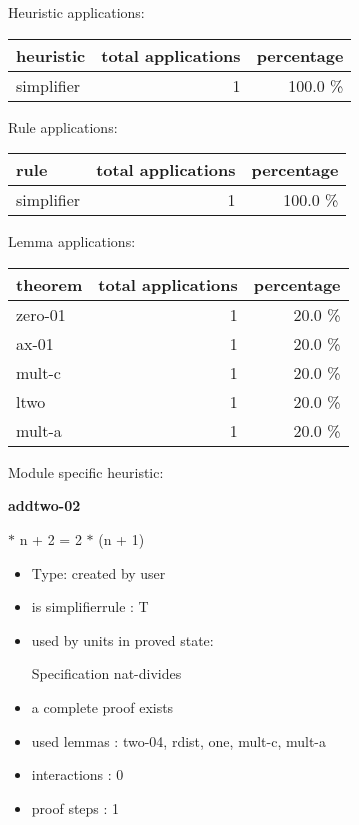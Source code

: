 \documentclass[a4paper]{article}
\begin{document}
\medskip


Heuristic applications:

\begin{supertabular}{l|r|r}
heuristic	& total applications & percentage \\ \hline
simplifier & 1 & 100.0 \% \\

\end{supertabular}

Rule applications:

\begin{supertabular}{l|r|r}
rule	        & total applications & percentage \\ \hline
simplifier & 1 & 100.0 \% \\

\end{supertabular}

Lemma applications:

\begin{supertabular}{l|r|r}
theorem	        & total applications & percentage \\ \hline
zero-01 & 1 & 20.0 \% \\
ax-01 & 1 & 20.0 \% \\
mult-c & 1 & 20.0 \% \\
ltwo & 1 & 20.0 \% \\
mult-a & 1 & 20.0 \% \\

\end{supertabular}

Module specific heuristic:

\pagebreak

{\LARGE\bf addtwo-02}\label{lemma-addtwo-02}

\medskip

  $*$ n + 2 = 2 $*$ (n + 1)

\begin{itemize}

\item Type: created by user

\item is simplifierrule : T
\item used by units in proved state:

Specification nat-divides
\item       a complete proof exists
\item       used lemmas  : two-04, rdist, one, mult-c, mult-a
\item       interactions : 0
\item       proof steps  : 1
\end{itemize}
\end{document}
